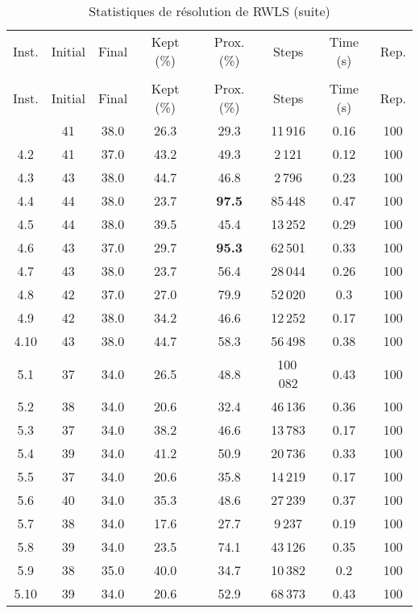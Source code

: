 {
\footnotesize
\begin{longtable}{@{\extracolsep{0pt}}cccccccc}
	\hiderowcolors
	\caption{Statistiques de résolution de \acrshort{RWLS}}\\
	\toprule
	Inst. & Initial & Final & Kept (\%) & Prox. (\%) & Steps & Time (s) & Rep.\\
	\midrule
	\endfirsthead
	\caption{Statistiques de résolution de \acrshort{RWLS} (suite)}\\
	\toprule
	Inst. & Initial & Final & Kept (\%) & Prox. (\%) & Steps & Time (s) & Rep.\\
	\midrule
	\endhead
	\bottomrule
	\endfoot
	\showrowcolors
	4.1 & 41 & 38.0 & 26.3 & 29.3 & 11\,916 & 0.16 & 100 \\
	4.2 & 41 & 37.0 & 43.2 & 49.3 & 2\,121 & 0.12 & 100 \\
	4.3 & 43 & 38.0 & 44.7 & 46.8 & 2\,796 & 0.23 & 100 \\
	4.4 & 44 & 38.0 & 23.7 & \textbf{97.5} & 85\,448 & 0.47 & 100 \\
	4.5 & 44 & 38.0 & 39.5 & 45.4 & 13\,252 & 0.29 & 100 \\
	4.6 & 43 & 37.0 & 29.7 & \textbf{95.3} & 62\,501 & 0.33 & 100 \\
	4.7 & 43 & 38.0 & 23.7 & 56.4 & 28\,044 & 0.26 & 100 \\
	4.8 & 42 & 37.0 & 27.0 & 79.9 & 52\,020 & 0.3 & 100 \\
	4.9 & 42 & 38.0 & 34.2 & 46.6 & 12\,252 & 0.17 & 100 \\
	4.10 & 43 & 38.0 & 44.7 & 58.3 & 56\,498 & 0.38 & 100 \\
	5.1 & 37 & 34.0 & 26.5 & 48.8 & 100\,082 & 0.43 & 100 \\
	5.2 & 38 & 34.0 & 20.6 & 32.4 & 46\,136 & 0.36 & 100 \\
	5.3 & 37 & 34.0 & 38.2 & 46.6 & 13\,783 & 0.17 & 100 \\
	5.4 & 39 & 34.0 & 41.2 & 50.9 & 20\,736 & 0.33 & 100 \\
	5.5 & 37 & 34.0 & 20.6 & 35.8 & 14\,219 & 0.17 & 100 \\
	5.6 & 40 & 34.0 & 35.3 & 48.6 & 27\,239 & 0.37 & 100 \\
	5.7 & 38 & 34.0 & 17.6 & 27.7 & 9\,237 & 0.19 & 100 \\
	5.8 & 39 & 34.0 & 23.5 & 74.1 & 43\,126 & 0.35 & 100 \\
	5.9 & 38 & 35.0 & 40.0 & 34.7 & 10\,382 & 0.2 & 100 \\
	5.10 & 39 & 34.0 & 20.6 & 52.9 & 68\,373 & 0.43 & 100 \\

\end{longtable}}

